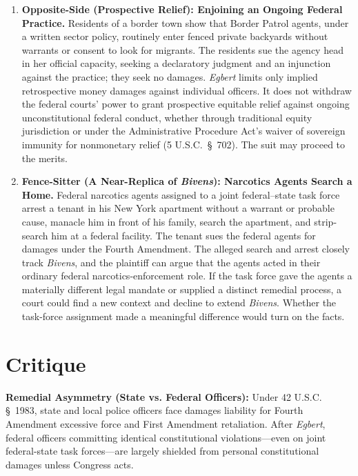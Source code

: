 \documentclass[12pt]{article}
\begin{document}
\begin{enumerate}
\item \textbf{Opposite-Side (Prospective Relief): Enjoining an Ongoing Federal Practice.} Residents of a border town show that Border Patrol agents, under a written sector policy, routinely enter fenced private backyards without warrants or consent to look for migrants. The residents sue the agency head in her official capacity, seeking a declaratory judgment and an injunction against the practice; they seek no damages. \textit{Egbert} limits only implied retrospective money damages against individual officers. It does not withdraw the federal courts' power to grant prospective equitable relief against ongoing unconstitutional federal conduct, whether through traditional equity jurisdiction or under the Administrative Procedure Act's waiver of sovereign immunity for nonmonetary relief (5 U.S.C.\ \S~702). The suit may proceed to the merits.

\item \textbf{Fence-Sitter (A Near-Replica of \textit{Bivens}): Narcotics Agents Search a Home.} Federal narcotics agents assigned to a joint federal--state task force arrest a tenant in his New York apartment without a warrant or probable cause, manacle him in front of his family, search the apartment, and strip-search him at a federal facility. The tenant sues the federal agents for damages under the Fourth Amendment. The alleged search and arrest closely track \textit{Bivens}, and the plaintiff can argue that the agents acted in their ordinary federal narcotics-enforcement role. If the task force gave the agents a materially different legal mandate or supplied a distinct remedial process, a court could find a new context and decline to extend \textit{Bivens}. Whether the task-force assignment made a meaningful difference would turn on the facts.

\end{enumerate}

\section{Critique}
\textbf{Remedial Asymmetry (State vs. Federal Officers):} Under 42 U.S.C. \S~1983, state and local police officers face damages liability for Fourth Amendment excessive force and First Amendment retaliation. After \textit{Egbert}, federal officers committing identical constitutional violations---even on joint federal-state task forces---are largely shielded from personal constitutional damages unless Congress acts.
\end{document}

